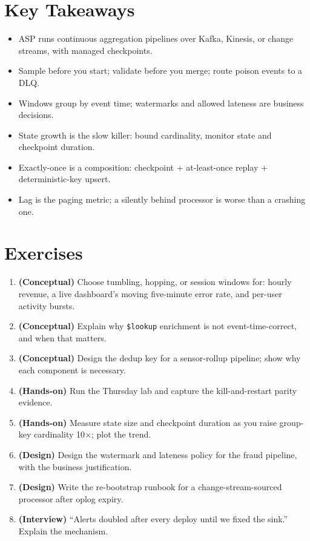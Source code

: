 \section*{Key Takeaways}
\begin{itemize}
    \item ASP runs continuous aggregation pipelines over Kafka, Kinesis, or change streams, with managed checkpoints.
    \item Sample before you start; validate before you merge; route poison events to a DLQ.
    \item Windows group by event time; watermarks and allowed lateness are business decisions.
    \item State growth is the slow killer: bound cardinality, monitor state and checkpoint duration.
    \item Exactly-once is a composition: checkpoint + at-least-once replay + deterministic-key upsert.
    \item Lag is the paging metric; a silently behind processor is worse than a crashing one.
\end{itemize}

\section{Exercises}
\begin{enumerate}
    \item \textbf{(Conceptual)} Choose tumbling, hopping, or session windows for: hourly revenue, a live dashboard's moving five-minute error rate, and per-user activity bursts.
    \item \textbf{(Conceptual)} Explain why \texttt{\$lookup} enrichment is not event-time-correct, and when that matters.
    \item \textbf{(Conceptual)} Design the dedup key for a sensor-rollup pipeline; show why each component is necessary.
    \item \textbf{(Hands-on)} Run the Thursday lab and capture the kill-and-restart parity evidence.
    \item \textbf{(Hands-on)} Measure state size and checkpoint duration as you raise group-key cardinality 10$\times$; plot the trend.
    \item \textbf{(Design)} Design the watermark and lateness policy for the fraud pipeline, with the business justification.
    \item \textbf{(Design)} Write the re-bootstrap runbook for a change-stream-sourced processor after oplog expiry.
    \item \textbf{(Interview)} ``Alerts doubled after every deploy until we fixed the sink.'' Explain the mechanism.
\end{enumerate}

